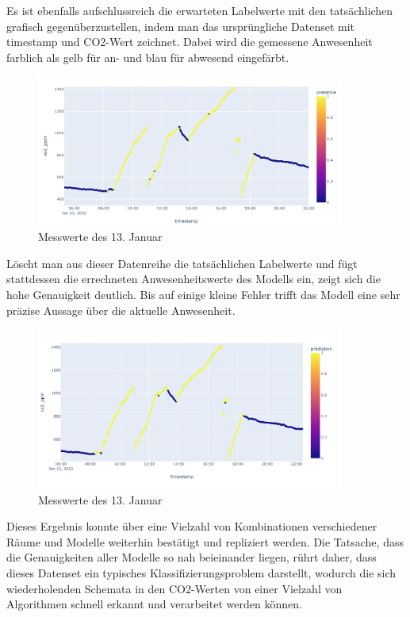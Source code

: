 \newpage
Es ist ebenfalls aufschlussreich die erwarteten Labelwerte mit den tatsächlichen grafisch gegenüberzustellen, 
indem man das ursprüngliche Datenset mit timestamp und CO2-Wert zeichnet. Dabei wird die gemessene Anwesenheit 
farblich als gelb für an- und blau für abwesend eingefärbt.

\begin{figure}[h]
    \centering
    \includegraphics[width=0.9\textwidth]{pic/nov23_actual.png}
    \caption{Messwerte des 13. Januar}
    \label{fig:ConMatrix}
\end{figure}

Löscht man aus dieser Datenreihe die tatsächlichen Labelwerte und fügt stattdessen die errechneten 
Anwesenheitswerte des Modells ein, zeigt sich die hohe Genauigkeit deutlich. Bis auf einige kleine Fehler
trifft das Modell eine sehr präzise Aussage über die aktuelle Anwesenheit.

\begin{figure}[h]
    \centering
    \includegraphics[width=0.9\textwidth]{pic/nov23_predicted.png}
    \caption{Messwerte des 13. Januar}
    \label{fig:ConMatrix}
\end{figure}

Dieses Ergebnis konnte über eine Vielzahl von Kombinationen verschiedener Räume und Modelle weiterhin
bestätigt und repliziert werden. Die Tatsache, dass die Genauigkeiten aller Modelle so nah beieinander 
liegen, rührt daher, dass dieses Datenset ein typisches Klassifizierungsproblem darstellt,
wodurch die sich wiederholenden Schemata in den CO2-Werten von einer Vielzahl von Algorithmen schnell 
erkannt und verarbeitet werden können.

